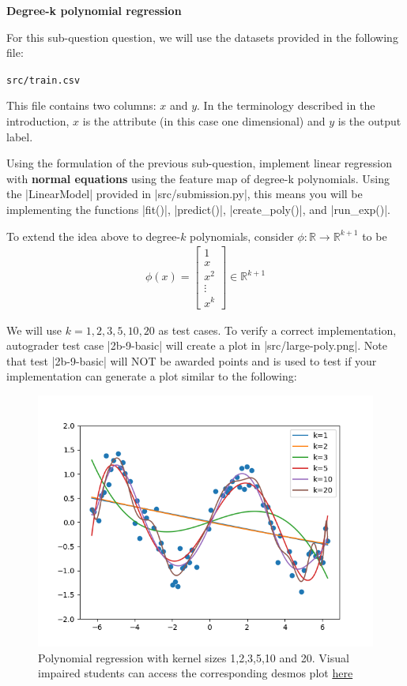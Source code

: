 \item {} {\bf Degree-k polynomial regression}


For this sub-question question, we will use the datasets provided in
the following file:
%
\begin{center}
	\texttt{src/train.csv}
\end{center}
%

This file contains two columns: $x$ and $y$. In the terminology described in the introduction, $x$ is the attribute (in this case one dimensional) and $y$ is the output label.

Using the formulation of the previous sub-question, implement linear regression with \textbf{normal equations} using the feature map of degree-k polynomials. Using the |LinearModel| provided in |src/submission.py|, this means you will be implementing the functions |fit()|, |predict()|, |create_poly()|, and |run_exp()|.  

To extend the idea above to degree-$k$ polynomials, consider $\phi:\mathbb{R}\rightarrow \mathbb{R}^{k+1}$ to be 
		\begin{align}
	\phi(x) = \left[\begin{array}{c} 1\\ x \\ x^2\\ \vdots \\x^k \end{array}\right]\in \mathbb{R}^{k+1} \label{eqn:feature-k}
	\end{align}

We will use $k=1,2,3,5,10,20$ as test cases. To verify a correct implementation, autograder test case |2b-9-basic| will create a plot in |src/large-poly.png|.  Note that test |2b-9-basic| will NOT be awarded points and is used to test if your implementation can generate a plot similar to the following:

\begin{figure}[H]
  \centering
  \includegraphics[width=0.65\linewidth]{02-featuremaps/large-poly.png}
  \centering
\caption{Polynomial regression with kernel sizes 1,2,3,5,10 and 20. Visual impaired students can access the corresponding desmos plot \href{https://www.desmos.com/calculator/n7zoh04cfm}{here}}
\end{figure}